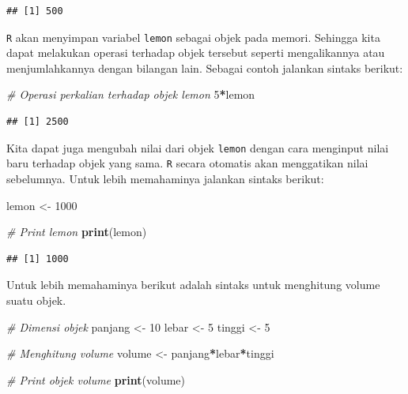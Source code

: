 \documentclass[]{book}
\newenvironment{Shaded}{\begin{snugshade}}{\end{snugshade}}
\newcommand{\KeywordTok}[1]{\textcolor[rgb]{0.13,0.29,0.53}{\textbf{#1}}}
\newcommand{\DecValTok}[1]{\textcolor[rgb]{0.00,0.00,0.81}{#1}}
\newcommand{\StringTok}[1]{\textcolor[rgb]{0.31,0.60,0.02}{#1}}
\newcommand{\CommentTok}[1]{\textcolor[rgb]{0.56,0.35,0.01}{\textit{#1}}}
\newcommand{\OperatorTok}[1]{\textcolor[rgb]{0.81,0.36,0.00}{\textbf{#1}}}
\newcommand{\NormalTok}[1]{#1}
\begin{document}
\begin{verbatim}
## [1] 500
\end{verbatim}

\texttt{R} akan menyimpan variabel \texttt{lemon} sebagai objek pada
memori. Sehingga kita dapat melakukan operasi terhadap objek tersebut
seperti mengalikannya atau menjumlahkannya dengan bilangan lain. Sebagai
contoh jalankan sintaks berikut:

\begin{Shaded}
\begin{Highlighting}[]
\CommentTok{# Operasi perkalian terhadap objek lemon}
\DecValTok{5}\OperatorTok{*}\NormalTok{lemon}
\end{Highlighting}
\end{Shaded}

\begin{verbatim}
## [1] 2500
\end{verbatim}

Kita dapat juga mengubah nilai dari objek \texttt{lemon} dengan cara
menginput nilai baru terhadap objek yang sama. \texttt{R} secara
otomatis akan menggatikan nilai sebelumnya. Untuk lebih memahaminya
jalankan sintaks berikut:

\begin{Shaded}
\begin{Highlighting}[]
\NormalTok{lemon <-}\StringTok{ }\DecValTok{1000}

\CommentTok{# Print lemon}
\KeywordTok{print}\NormalTok{(lemon)}
\end{Highlighting}
\end{Shaded}

\begin{verbatim}
## [1] 1000
\end{verbatim}

Untuk lebih memahaminya berikut adalah sintaks untuk menghitung volume
suatu objek.

\begin{Shaded}
\begin{Highlighting}[]
\CommentTok{# Dimensi objek}
\NormalTok{panjang <-}\StringTok{ }\DecValTok{10}
\NormalTok{lebar <-}\StringTok{ }\DecValTok{5}
\NormalTok{tinggi <-}\StringTok{ }\DecValTok{5}

\CommentTok{# Menghitung volume}
\NormalTok{volume <-}\StringTok{ }\NormalTok{panjang}\OperatorTok{*}\NormalTok{lebar}\OperatorTok{*}\NormalTok{tinggi}

\CommentTok{# Print objek volume}
\KeywordTok{print}\NormalTok{(volume)}
\end{Highlighting}
\end{Shaded}
\end{document}
